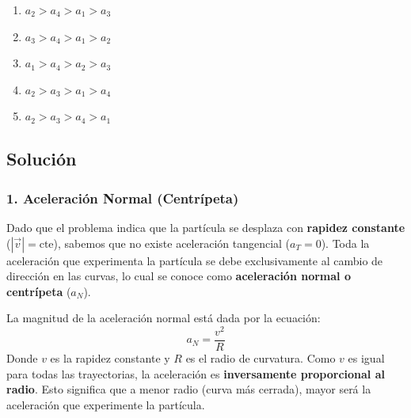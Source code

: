 \documentclass[12pt, a4paper]{article}
\begin{document}
\begin{center}
\end{center}

\begin{enumerate}[label=\alph*)]
    \item $a_2 > a_4 > a_1 > a_3$
    \item $a_3 > a_4 > a_1 > a_2$
    \item $a_1 > a_4 > a_2 > a_3$
    \item $a_2 > a_3 > a_1 > a_4$
    \item $a_2 > a_3 > a_4 > a_1$
\end{enumerate}

\subsection*{Solución}

\subsubsection*{1. Aceleración Normal (Centrípeta)}
Dado que el problema indica que la partícula se desplaza con \textbf{rapidez constante} ($|\vec{v}| = \text{cte}$), sabemos que no existe aceleración tangencial ($a_T = 0$). Toda la aceleración que experimenta la partícula se debe exclusivamente al cambio de dirección en las curvas, lo cual se conoce como \textbf{aceleración normal o centrípeta} ($a_N$).

La magnitud de la aceleración normal está dada por la ecuación:
$$ a_N = \frac{v^2}{R} $$
Donde $v$ es la rapidez constante y $R$ es el radio de curvatura.
Como $v$ es igual para todas las trayectorias, la aceleración es \textbf{inversamente proporcional al radio}. Esto significa que a menor radio (curva más cerrada), mayor será la aceleración que experimente la partícula.
\end{document}

